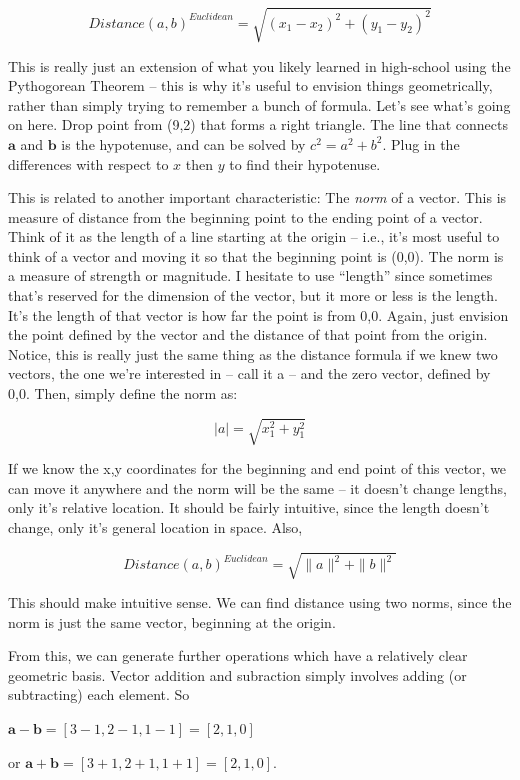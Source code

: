 \documentclass[
]{book}
\begin{document}
\[Distance(a,b)^{Euclidean}=\sqrt{(x_1-x_2)^2+(y_1-y_2)^2} \]

This is really just an extension of what you likely learned in
high-school using the Pythogorean Theorem -- this is why it's useful to
envision things geometrically, rather than simply trying to remember a
bunch of formula. Let's see what's going on here. Drop point from (9,2)
that forms a right triangle. The line that connects \(\textbf{a}\) and
\(\textbf{b}\) is the hypotenuse, and can be solved by \(c^2=a^2+b^2\). Plug
in the differences with respect to \(x\) then \(y\) to find their
hypotenuse.

This is related to another important characteristic: The \emph{norm} of a
vector. This is measure of distance from the beginning point to the
ending point of a vector. Think of it as the length of a line starting
at the origin -- i.e., it's most useful to think of a vector and moving
it so that the beginning point is (0,0). The norm is a measure of
strength or magnitude. I hesitate to use ``length'' since sometimes that's
reserved for the dimension of the vector, but it more or less is the
length. It's the length of that vector is how far the point is from 0,0.
Again, just envision the point defined by the vector and the distance of
that point from the origin. Notice, this is really just the same thing
as the distance formula if we knew two vectors, the one we're interested
in -- call it a -- and the zero vector, defined by 0,0. Then, simply
define the norm as:

\[
|a|=\sqrt{x_1^2+y_1^2}
\]

If we know the x,y coordinates for the beginning and end point of this
vector, we can move it anywhere and the norm will be the same -- it
doesn't change lengths, only it's relative location. It should be fairly
intuitive, since the length doesn't change, only it's general location
in space. Also,

\[Distance(a,b)^{Euclidean}=\sqrt{\|a\|^{2}+\|b\|^{2}}\]

This should make intuitive sense. We can find distance using two norms,
since the norm is just the same vector, beginning at the origin.

From this, we can generate further operations which have a relatively
clear geometric basis. Vector addition and subraction simply involves
adding (or subtracting) each element. So

\(\textbf{a}-\textbf{b}=[3-1, 2-1, 1-1]=[2,1,0]\)

or \(\textbf{a}+\textbf{b}=[3+1, 2+1, 1+1]=[2,1,0]\).
\end{document}
